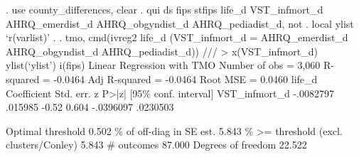 . use county_differences, clear
{\smallskip}
. qui ds fips stfips life_d VST_infmort_d AHRQ_emerdist_d AHRQ_obgyndist_d AHRQ_pediadist_d, not
{\smallskip}
. local ylist `r(varlist)'
{\smallskip}
. 
. tmo, cmd(ivreg2 life_d (VST_infmort_d = AHRQ_emerdist_d AHRQ_obgyndist_d AHRQ_pediadist_d)) ///
> x(VST_infmort_d) ylist(`ylist') i(fips)
{\smallskip}
Linear Regression with TMO                             Number of obs =   3,060
                                                       R-squared     = -0.0464
                                                       Adj R-squared = -0.0464
                                                       Root MSE      =  0.0460
{\smallskip}
       life_d {\VBAR} Coefficient  Std. err.      z    P>|z|     [95\% conf. interval]
VST_infmort_d {\VBAR}  -.0082797    .015985    -0.52   0.604    -.0396097    .0230503
                                                                               
                                                   Optimal threshold      0.502
                                            \% of off-diag in SE est.      5.843
                              \% >= threshold (excl. clusters/Conley)      5.843
                                                          \# outcomes     87.000
                                                  Degrees of freedom     22.522
